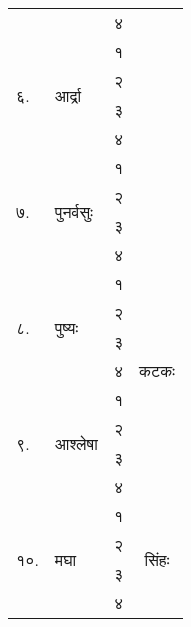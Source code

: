 \begin{longtable}{|l@{~}l|>{\tiny}c|c|}
  &                          & ४            &                        \\*
  \cline{1-3}\multirow{4}{*}{ ६.} & \multirow{4}{*}{आर्द्रा}   & १            &                        \\*
  &                          & २            &                        \\*
  &                          & ३            &                        \\*
  &                          & ४            &                        \\*
  \cline{1-3}\multirow{4}{*}{ ७.} & \multirow{4}{*}{पुनर्वसुः}  & १            &                        \\*
  &                          & २            &                        \\*
  &                          & ३            &                        \\*
  \cline{3-4}                     &                          & ४            & \multirow{9}{*}{कटकः}  \\*
  \cline{1-3}\multirow{4}{*}{ ८.} & \multirow{4}{*}{पुष्यः}    & १            &                        \\*
  &                          & २            &                        \\*
  &                          & ३            &                        \\*
  &                          & ४            &                        \\*
  \cline{1-3}\multirow{4}{*}{ ९.} & \multirow{4}{*}{आश्लेषा}   & १            &                        \\*
  &                          & २            &                        \\*
  &                          & ३            &                        \\*
  &                          & ४            &                        \\\hline
  \multirow{4}{*}{१०.}            & \multirow{4}{*}{मघा}                   & १            & \multirow{9}{*}{सिंहः}   \\*
  &                                        & २            &                         \\*
  &                                        & ३            &                         \\*
  &                                        & ४            &                         \\*

\end{longtable}
